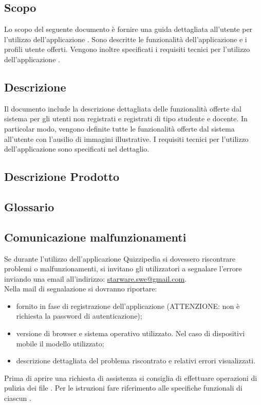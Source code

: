 \documentclass[12pt,a4paper]{article}
\begin{document}
	\subsection{Scopo}
	Lo scopo del seguente documento è fornire una guida dettagliata all’utente per l’utilizzo dell’applicazione \prj{}. Sono descritte le funzionalità dell'applicazione e i profili utente offerti.
	Vengono inoltre specificati i requisiti tecnici per l'utilizzo dell'applicazione \prj{}.

	\subsection{Descrizione}
    Il documento include la descrizione dettagliata delle funzionalità offerte dal sistema per gli utenti non registrati e registrati di tipo studente e docente. In particolar modo, vengono definite tutte le funzionalità offerte dal sistema all’utente con l’ausilio di immagini illustrative. 
    I requisiti tecnici per l'utilizzo dell'applicazione \prj{} sono specificati nel dettaglio.
	
	\subsection{Descrizione Prodotto}
	\descrizioneProdotto
	
	\subsection{Glossario}
	\glossarioManualiPrint
	\subsection{Comunicazione malfunzionamenti}
	Se durante l’utilizzo dell’applicazione Quizzipedia si dovessero riscontrare problemi o 	malfunzionamenti, si invitano gli utilizzatori a segnalare l’errore inviando una email all’indirizzo:
	\url{starware.swe@gmail.com}. \\
	Nella mail di segnalazione si dovranno riportare:
	\begin{itemize}
		\item {} fornito in fase di registrazione dell’applicazione (ATTENZIONE: non è richiesta la password di autenticazione);
		\item versione di browser e sistema operativo utilizzato. Nel caso di dispositivi mobile il modello utilizzato;
		\item descrizione dettagliata del problema riscontrato e relativi errori visualizzati.
	\end{itemize}
	Prima di aprire una richiesta di assistenza si consiglia di effettuare operazioni di pulizia dei file . Per le istruzioni fare riferimento alle specifiche funzionali di ciascun .
	
\end{document}
